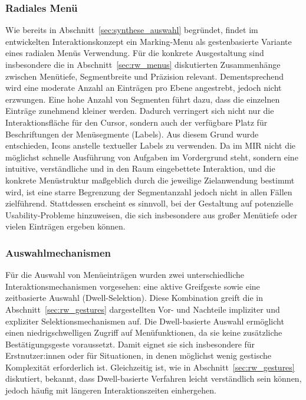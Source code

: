 \subsubsection{Radiales Menü}
\label{sec:synthese_radiales_menü}
Wie bereits in Abschnitt~\ref{sec:synthese_auswahl} begründet, findet im entwickelten Interaktionskonzept ein Marking-Menu als gestenbasierte Variante eines radialen Menüs Verwendung. Für die konkrete Ausgestaltung sind insbesondere die in Abschnitt~\ref{sec:rw_menus} diskutierten Zusammenhänge zwischen Menü\-tiefe, Segmentbreite und Präzision relevant.
Dementsprechend wird eine moderate Anzahl an Einträgen pro Ebene angestrebt, jedoch nicht erzwungen. Eine hohe Anzahl von Segmenten führt dazu, dass die einzelnen Einträge zunehmend kleiner werden. Dadurch verringert sich nicht nur die Interaktionsfläche für den Cursor, sondern auch der verfügbare Platz für Beschriftungen der Menüsegmente (Labels). Aus diesem Grund wurde entschieden, Icons anstelle textueller Labels zu verwenden.
Da im MIR nicht die möglichst schnelle Ausführung von Aufgaben im Vordergrund steht, sondern eine intuitive, verständliche und in den Raum eingebettete Interaktion, und die konkrete Menüstruktur maßgeblich durch die jeweilige Zielanwendung bestimmt wird, ist eine starre Begrenzung der Segmentanzahl jedoch nicht in allen Fällen zielführend. Stattdessen erscheint es sinnvoll, bei der Gestaltung auf potenzielle Usability-Probleme hinzuweisen, die sich insbesondere aus großer Menü\-tiefe oder vielen Einträgen ergeben können.


\subsubsection{Auswahlmechanismen}
Für die Auswahl von Menüeinträgen wurden zwei unterschiedliche Interaktionsmechanismen vorgesehen: eine aktive Greifgeste sowie eine zeitbasierte Auswahl (Dwell-Selektion). Diese Kombination greift die in Abschnitt~\ref{sec:rw_gestures} dargestellten Vor- und Nachteile impliziter und expliziter Selektionsmechanismen auf.
Die Dwell-basierte Auswahl ermöglicht einen niedrigschwelligen Zugriff auf Menü\-funktionen, da sie keine zusätzliche Bestätigungsgeste voraussetzt. Damit eignet sie sich insbesondere für Erstnutzer:innen oder für Situationen, in denen möglichst wenig gestische Komplexität erforderlich ist. Gleichzeitig ist, wie in Abschnitt~\ref{sec:rw_gestures} diskutiert, bekannt, dass Dwell-basierte Verfahren leicht verständlich sein können, jedoch häufig mit längeren Interaktionszeiten einhergehen.

